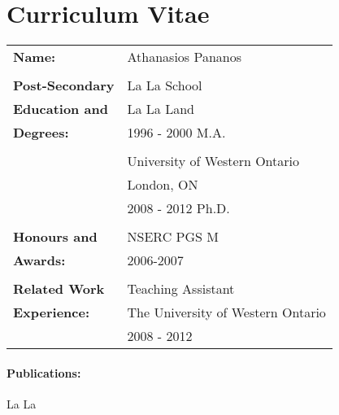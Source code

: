 \documentclass[12pt,twoside]{report}
\numberwithin{figure}{chapter}
\newcommand{\firstname}{Athanasios}
\newcommand{\lastname}{Pananos}
\begin{document}
\chapter*{Curriculum Vitae}
\begin{table}[ht]
\begin{tabular}{ll}
\textbf{Name:} & \firstname{} \lastname\\\\
\textbf{Post-Secondary} & La La School\\
\textbf{Education and}& La La Land\\
\textbf{Degrees:}& 1996 - 2000 M.A.\\\\
& University of Western Ontario\\
& London, ON\\
& 2008 - 2012 Ph.D.\\\\
\textbf{Honours and}& NSERC PGS M\\
\textbf{Awards:}& 2006-2007\\\\
\textbf{Related Work}& Teaching Assistant\\
\textbf{Experience:}& The University of Western Ontario\\
& 2008 - 2012\\
\end{tabular}
\end{table}
\subsubsection*{Publications:}
La La
\end{document}
